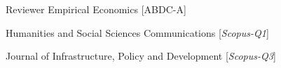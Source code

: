 
\begin{cvskills}
\cvskill
{Reviewer} %
{Empirical Economics [ABDC-A]} %

\cvskill
{} %
{Humanities and Social Sciences Communications [\textit{Scopus-Q1}]} %

\cvskill
{} %
{Journal of Infrastructure, Policy and Development [\textit{Scopus-Q3}]} %

\end{cvskills}
\relax